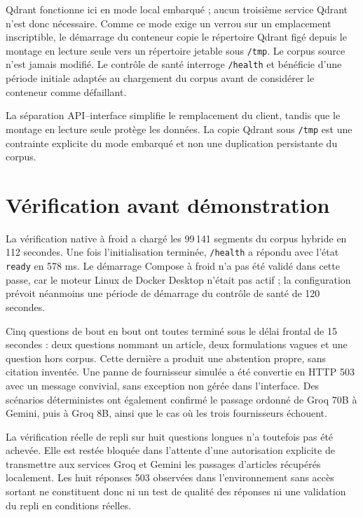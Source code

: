 Qdrant fonctionne ici en mode local embarqué ; aucun troisième service Qdrant
n'est donc nécessaire. Comme ce mode exige un verrou sur un emplacement inscriptible,
le démarrage du conteneur copie le répertoire Qdrant figé depuis le montage en
lecture seule vers un répertoire jetable sous \texttt{/tmp}. Le corpus source
n'est jamais modifié. Le contrôle de santé interroge \texttt{/health} et bénéficie
d'une période initiale adaptée au chargement du corpus avant de considérer le
conteneur comme défaillant.

\begin{encadre}
La séparation API--interface simplifie le remplacement du client, tandis que le
montage en lecture seule protège les données. La copie Qdrant sous \texttt{/tmp}
est une contrainte explicite du mode embarqué et non une duplication persistante
du corpus.
\end{encadre}

\section{Vérification avant démonstration}

La vérification native à froid a chargé les 99\,141 segments du corpus hybride en
112 secondes. Une fois l'initialisation terminée, \texttt{/health} a répondu avec
l'état \texttt{ready} en 578 ms. Le démarrage Compose à froid n'a pas été validé
dans cette passe, car le moteur Linux de Docker Desktop n'était pas actif ; la
configuration prévoit néanmoins une période de démarrage du contrôle de santé de
120 secondes.

Cinq questions de bout en bout ont toutes terminé sous le délai frontal de
15 secondes : deux questions nommant un article, deux formulations vagues et une
question hors corpus. Cette dernière a produit une abstention propre, sans citation
inventée. Une panne de fournisseur simulée a été convertie en HTTP 503 avec un
message convivial, sans exception non gérée dans l'interface. Des scénarios
déterministes ont également confirmé le passage ordonné de Groq 70B à Gemini,
puis à Groq 8B, ainsi que le cas où les trois fournisseurs échouent.

La vérification réelle de repli sur huit questions longues n'a toutefois pas été
achevée. Elle est restée bloquée dans l'attente d'une autorisation explicite de
transmettre aux services Groq et Gemini les passages d'articles récupérés
localement. Les huit réponses 503 observées dans l'environnement sans accès sortant
ne constituent donc ni un test de qualité des réponses ni une validation du repli
en conditions réelles.

